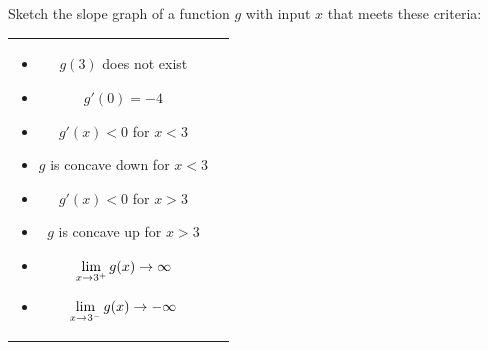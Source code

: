 \documentclass[notes]{subfiles}
\begin{document}
		\begin{ex}
			Sketch the slope graph of a function $g$ with input $x$ that meets these criteria:\\[5pt]
				\begin{tabular}{cc}
				\begin{minipage}{3.5in}
				\begin{itemize}
					\item $g(3)$ does not exist
					\item $g'(0) = -4$
					\item $g'(x) < 0$ for $x < 3$
					\item $g$ is concave down for $x < 3$
				\end{itemize}
				\end{minipage}
				\begin{minipage}{3.5in}
				\begin{itemize}
					\item $g'(x) < 0$ for $x > 3$
					\item $g$ is concave up for $x > 3$
					\item $\displaystyle \lim_{x\to 3^+} g(x) \to \infty$
					\item $\displaystyle \lim_{x\to 3^-} g(x) \to -\infty$
				\end{itemize}
				\end{minipage}
				\end{tabular}
		\end{ex}
\end{document}
